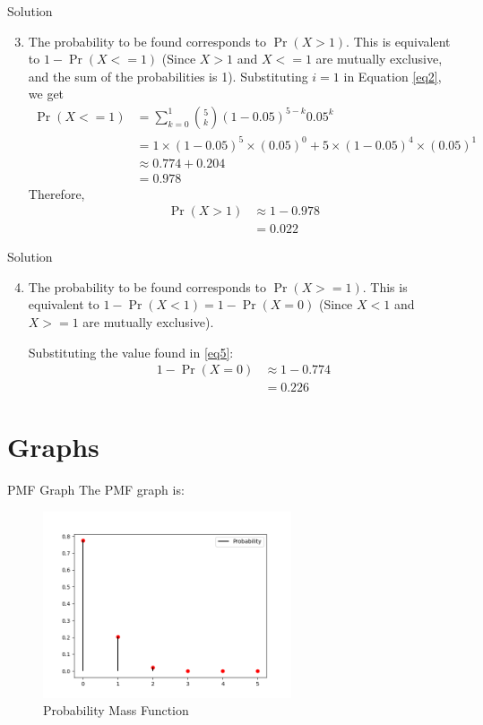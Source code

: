 \documentclass{beamer}
\providecommand{\pr}[1]{\ensuremath{\Pr\left(#1\right)}}
\providecommand{\brak}[1]{\ensuremath{\left(#1\right)}}
\begin{document}
\begin{frame}{Solution}
\begin{enumerate}[label=(\roman*)]
  \setcounter{enumi}{2}
\item The probability to be found corresponds to $\pr{X>1}$. This is equivalent to $1-\pr{X<=1}$ (Since $X>1$ and $X<=1$ are mutually exclusive, and the sum of the probabilities is 1). Substituting $i=1$ in Equation \ref{eq2}, we get
\begin{align}
    \pr{X<=1} &= \sum_{k=0}^{1} \binom{5}{k} (1-0.05)^{5-k} 0.05^k \\
             &= 1 \times \brak{1-0.05}^{5} \times \brak{0.05}^0 +5 \times \brak{1-0.05}^{4} \times \brak{0.05}^1 \\
             &\approx 0.774+0.204 \\
             &= 0.978
\end{align}
Therefore,
\begin{align}
    \pr{X>1} &\approx 1-0.978 \\
             &= 0.022
\end{align}

\end{enumerate}
\end{frame}


\begin{frame}{Solution}
\begin{enumerate}[label=(\roman*)]
  \setcounter{enumi}{3}
\item The probability to be found corresponds to $\pr{X>=1}$. This is equivalent to $1-\pr{X<1} = 1-\pr{X=0}$ (Since $X<1$ and $X>=1$ are mutually exclusive).

Substituting the value found in \ref{eq5}:
\begin{align}
    1-\pr{X=0} &\approx 1-0.774 \\
             &= 0.226
\end{align}
\end{enumerate}
\end{frame}

\section{Graphs}
\begin{frame}{PMF Graph}
The PMF graph is:
    \begin{figure}[!ht]
		\centering
		\includegraphics[width=\textwidth,height=5.5cm,keepaspectratio]{figures/PMF.png}
		\caption{Probability Mass Function}
		\label{fig1}
	\end{figure}
\end{frame}
\end{document}
